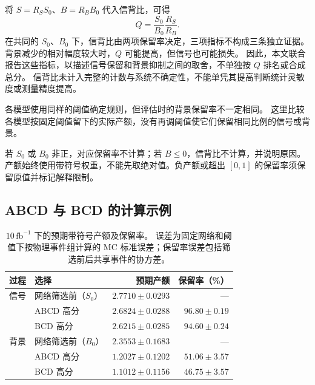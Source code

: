 \documentclass[11pt,a4paper,fontset=fandol,scheme=plain]{ctexart}
\begin{document}
将 $S=R_SS_0$、$B=R_BB_0$ 代入信背比，可得
\[
 Q=\frac{S_0}{B_0}\frac{R_S}{R_B}.
\]
在共同的 $S_0$、$B_0$ 下，信背比由两项保留率决定，三项指标不构成三条独立证据。
背景减少的相对幅度较大时，$Q$ 可能提高，但信号也可能损失。
因此，本文联合报告这些指标，以描述信号保留和背景抑制之间的取舍，不单独按 $Q$ 排名或合成总分。
信背比未计入完整的计数与系统不确定性，不能单凭其提高判断统计灵敏度或测量精度提高。

各模型使用同样的阈值确定规则，但评估时的背景保留率不一定相同。
这里比较各模型按固定阈值留下的实际产额，没有再调阈值使它们保留相同比例的信号或背景。

若 $S_0$ 或 $B_0$ 非正，对应保留率不计算；若 $B\leq0$，信背比不计算，并说明原因。
产额始终使用带符号权重，不能先取绝对值。负产额或超出 $[0,1]$ 的保留率须保留原值并标记解释限制。

\subsection{ABCD 与 BCD 的计算示例}
\begin{table}[H]
\caption{$10\,\mathrm{fb}^{-1}$ 下的预期带符号产额及保留率。
误差为固定网络和阈值下按物理事件组计算的 MC 标准误差；保留率误差包括筛选前后共享事件的协方差。}
\label{tab:yields}
\centering
\begin{tabular}{llrr}
\toprule
过程 & 选择 & 预期产额 & 保留率（\%） \\
\midrule
信号 & 网络筛选前（$S_0$） & $2.7710\pm0.0293$ & --- \\
 & ABCD 高分 & $2.6824\pm0.0288$ & $96.80\pm0.19$ \\
 & BCD 高分 & $2.6215\pm0.0285$ & $94.60\pm0.24$ \\
背景 & 网络筛选前（$B_0$） & $2.3553\pm0.1683$ & --- \\
 & ABCD 高分 & $1.2027\pm0.1202$ & $51.06\pm3.57$ \\
 & BCD 高分 & $1.1012\pm0.1156$ & $46.75\pm3.57$ \\
\bottomrule
\end{tabular}
\end{table}
\end{document}
